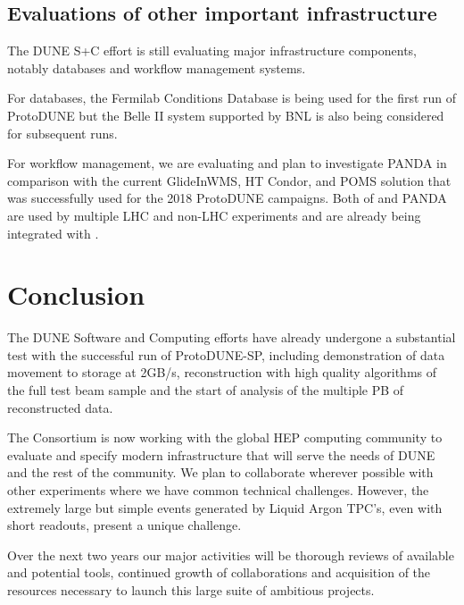 


  \subsection{Evaluations of other important infrastructure}

  The DUNE S+C effort is still evaluating major infrastructure components, notably databases and workflow management systems.

  For databases\cite{Laycock:2019ynk}, the Fermilab Conditions Database is being used for the first run of ProtoDUNE but the Belle II\cite{Ritter:2018jxh} system supported by BNL is also being considered for subsequent runs.

  For workflow management, we are evaluating \cite{Falabella:2016waj} and plan to investigate PANDA \cite{Megino:2017ywl} in comparison with the current GlideInWMS, HT Condor, and POMS solution that was successfully used for the 2018 ProtoDUNE campaigns.
  Both of  and PANDA are used by multiple LHC and non-LHC experiments and are already being integrated with .


  \section{Conclusion}

  The DUNE Software and Computing efforts have already undergone a substantial test with the successful run of ProtoDUNE-SP, including demonstration of data movement to storage at 2GB/s, reconstruction with high quality algorithms of the full test beam sample and the start of analysis of the multiple PB of reconstructed data.

  The Consortium is now working with the global HEP computing community to evaluate and specify modern infrastructure that will serve the needs of DUNE and the rest of the community.  We plan to collaborate wherever possible with other experiments where we have common technical challenges. However, the extremely large but simple events generated by Liquid Argon TPC's, even with short readouts, present a unique challenge.

  Over the next two years our major activities  will be  thorough reviews of available and potential tools, continued growth of collaborations and acquisition of the resources necessary to launch this large suite of ambitious projects.

